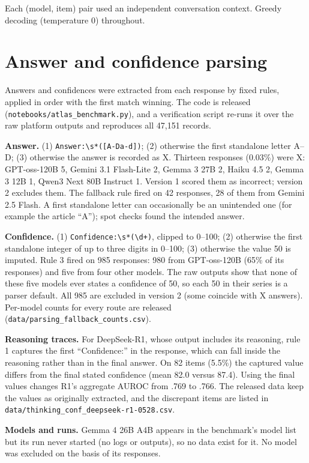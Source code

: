 Each (model, item) pair used an independent conversation context. Greedy decoding (temperature 0) throughout.

\section{Answer and confidence parsing}
\label{app:parsing}

Answers and confidences were extracted from each response by fixed rules, applied in order with the first match winning. The code is released (\texttt{notebooks/atlas\_benchmark.py}), and a verification script re-runs it over the raw platform outputs and reproduces all 47{,}151 records.

\textbf{Answer.} (1) \texttt{Answer:\textbackslash s*([A-Da-d])}; (2) otherwise the first standalone letter A--D; (3) otherwise the answer is recorded as X. Thirteen responses (0.03\%) were X: GPT-oss-120B 5, Gemini 3.1 Flash-Lite 2, Gemma 3 27B 2, Haiku 4.5 2, Gemma 3 12B 1, Qwen3 Next 80B Instruct 1. Version 1 scored them as incorrect; version 2 excludes them. The fallback rule fired on 42 responses, 28 of them from Gemini 2.5 Flash. A first standalone letter can occasionally be an unintended one (for example the article ``A''); spot checks found the intended answer.

\textbf{Confidence.} (1) \texttt{Confidence:\textbackslash s*(\textbackslash d+)}, clipped to 0--100; (2) otherwise the first standalone integer of up to three digits in 0--100; (3) otherwise the value 50 is imputed. Rule 3 fired on 985 responses: 980 from GPT-oss-120B (65\% of its responses) and five from four other models. The raw outputs show that none of these five models ever states a confidence of 50, so each 50 in their series is a parser default. All 985 are excluded in version 2 (some coincide with X answers). Per-model counts for every route are released (\texttt{data/parsing\_fallback\_counts.csv}).

\textbf{Reasoning traces.} For DeepSeek-R1, whose output includes its reasoning, rule 1 captures the first ``Confidence:'' in the response, which can fall inside the reasoning rather than in the final answer. On 82 items (5.5\%) the captured value differs from the final stated confidence (mean 82.0 versus 87.4). Using the final values changes R1's aggregate AUROC from .769 to .766. The released data keep the values as originally extracted, and the discrepant items are listed in \texttt{data/thinking\_conf\_deepseek-r1-0528.csv}.

\textbf{Models and runs.} Gemma 4 26B A4B appears in the benchmark's model list but its run never started (no logs or outputs), so no data exist for it. No model was excluded on the basis of its responses.

